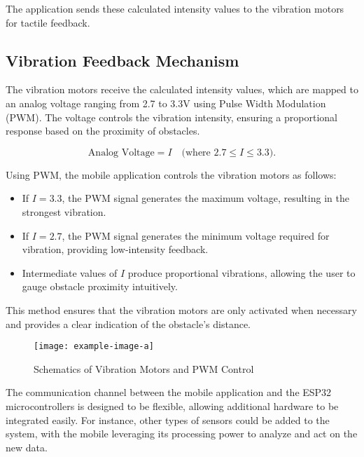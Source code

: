 The application sends these calculated intensity values to the vibration motors for tactile feedback.

\subsection{Vibration Feedback Mechanism}

The vibration motors receive the calculated intensity values, which are mapped to an analog voltage ranging from 2.7 to 3.3V using Pulse Width Modulation (PWM). The voltage controls the vibration intensity, ensuring a proportional response based on the proximity of obstacles.

\[
\text{Analog Voltage} = I \quad \text{(where \(2.7 \leq I \leq 3.3\))}.
\]

Using PWM, the mobile application controls the vibration motors as follows:
\begin{itemize}
	\item If \(I = 3.3\), the PWM signal generates the maximum voltage, resulting in the strongest vibration.
	\item If \(I = 2.7\), the PWM signal generates the minimum voltage required for vibration, providing low-intensity feedback.
	\item Intermediate values of \(I\) produce proportional vibrations, allowing the user to gauge obstacle proximity intuitively.
\end{itemize}

This method ensures that the vibration motors are only activated when necessary and provides a clear indication of the obstacle's distance.

\begin{figure}[h]
	\centering
	\texttt{[image: example-image-a]}
	\caption{Schematics of Vibration Motors and PWM Control}
	\label{fig:schematic_vibration}
\end{figure}

The communication channel between the mobile application and the ESP32 microcontrollers is designed to be flexible, allowing additional hardware to be integrated easily. For instance, other types of sensors could be added to the system, with the mobile leveraging its processing power to analyze and act on the new data.
